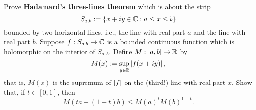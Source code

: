 \documentclass{homework}
\begin{document}
                                                        \begin{problem}\label{hadamard-three-lines}Prove \textbf{Hadamard's
                                                            three-lines theorem} which is about the strip
                                                              \[
                                                                  S_{a,b} := \{ x+iy \in \mathbb{C} : a \leq x \leq b\}
                                                                    \]
                                                                      bounded by two horizontal lines, i.e., the line with real part $a$
                                                                        and the line with real part $b$.  Suppose $f : S_{a,b} \to \mathbb{C}$ is a
                                                                          bounded continuous function which is holomorphic on the interior of
                                                                            $S_{a,b}$.  Define $M : [a,b] \to \mathbb{R}$ by
                                                                              \[
                                                                                  M(x) := \sup_{y \in \mathbb{R}} \left|f(x+iy)\right|,
                                                                                    \]
                                                                                      that is, $M(x)$ is the supremum of $\left|f\right|$ on the (third!) line with real part $x$.
                                                                                        Show that, if $t \in [0,1]$, then \[
                                                                                            M\left( ta + (1-t)b \right) \leq M(a)^t M(b)^{1-t}.
                                                                                              \]
                                                                                              \end{problem}
\end{document}
